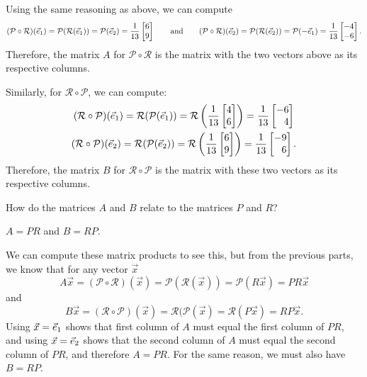 \begin{parts}
\begin{solution}
				Using the same reasoning as above, we can compute
				\[
					(\mathcal P\circ\mathcal R)(\xhat)
					=\mathcal P(\mathcal R(\xhat))
					=\mathcal P(\yhat)
					=\frac{1}{13}\mat{6\\9}
					\qquad \text{and} \qquad
					(\mathcal P\circ\mathcal R)(\yhat)
					=\mathcal P(\mathcal R(\yhat))
					=\mathcal P(-\xhat)
					=\frac{1}{13}\mat{-4\\-6}.
				\]
				Therefore, the matrix $A$ for $\mathcal P\circ\mathcal R$ is the
				matrix with the two vectors above as its respective columns.

				Similarly, for $\mathcal R\circ \mathcal P$, we can compute:
				\begin{gather*}
					(\mathcal R\circ\mathcal P)(\xhat)
					=\mathcal R(\mathcal P(\xhat))
					=\mathcal R\left(\frac{1}{13}\mat{4\\6}\right)
					=\frac{1}{13}\mat{-6\\4} \\
					(\mathcal R\circ\mathcal P)(\yhat)
					=\mathcal R(\mathcal P(\yhat))
					=\mathcal R\left(\frac{1}{13}\mat{6\\9}\right)
					=\frac{1}{13}\mat{-9\\6}.
				\end{gather*}
				Therefore, the matrix $B$ for $\mathcal R\circ\mathcal P$ is the
				matrix with these two vectors as its respective columns.
			\end{solution}
		\item How do the matrices $A$ and $B$ relate to the matrices $P$ and $R$?
			\begin{solution}
				$A = PR$ and $B = RP$.

				We can compute these matrix products to see this, but
				from the previous parts, we know that for any vector $\vec x$
				\[
					A\vec x
					=(\mathcal P\circ\mathcal R)(\vec x)
					=\mathcal P(\mathcal R(\vec x))
					=\mathcal P(R\vec x)
					=PR\vec x
				\]
				and
				\[
					B\vec x
					=(\mathcal R\circ\mathcal P)(\vec x)
					=\mathcal R(\mathcal P(\vec x)
					=\mathcal R(P\vec x)
					=RP\vec x.
				\]
				Using $\vec x = {\vec e_1}$ shows that first column of $A$ must equal
				the first column of $PR$, and using $\vec x = {\vec e_2}$ shows that
				the second column of $A$ must equal the second column of $PR$,
				and therefore $A = PR$. For the same reason, we must also have $B=RP$.
			\end{solution}

	\end{parts}

